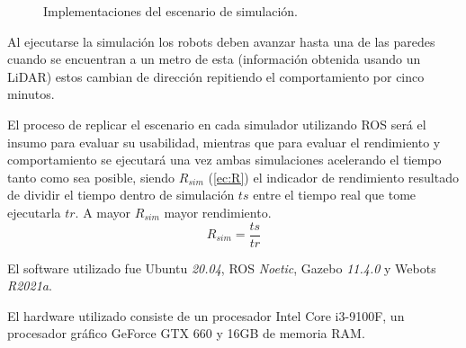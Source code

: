 \begin{figure}[H]
  \centering
  \qquad
  \caption{Implementaciones del escenario de simulación.}\label{fig:impsim}
\end{figure}

Al ejecutarse la simulación los robots deben avanzar hasta una de las paredes
cuando se encuentran a un metro de esta (información obtenida usando un \gls{LiDAR}) %
estos cambian de dirección repitiendo el comportamiento por cinco minutos.

El proceso de replicar el escenario en cada simulador utilizando \gls{ROS} será el
insumo para evaluar su usabilidad, mientras que para evaluar el rendimiento y
comportamiento se ejecutará una vez ambas simulaciones acelerando el tiempo
tanto como sea posible, siendo $R_{sim}$ (\ref{ec:R}) el indicador de
rendimiento resultado de dividir el tiempo dentro de simulación $ts$ entre el
tiempo real que tome ejecutarla $tr$. A mayor $R_{sim}$ mayor rendimiento.
\begin{equation}\label{ec:R} R_{sim} = \frac{ts}{tr} \end{equation}

El software utilizado fue Ubuntu \emph{20.04}, \gls{ROS} \emph{Noetic}, Gazebo \emph{11.4.0} y Webots \emph{R2021a}. 

El hardware utilizado consiste de un procesador Intel Core i3-9100F, un procesador
gráfico GeForce GTX 660 y 16GB de memoria RAM.

